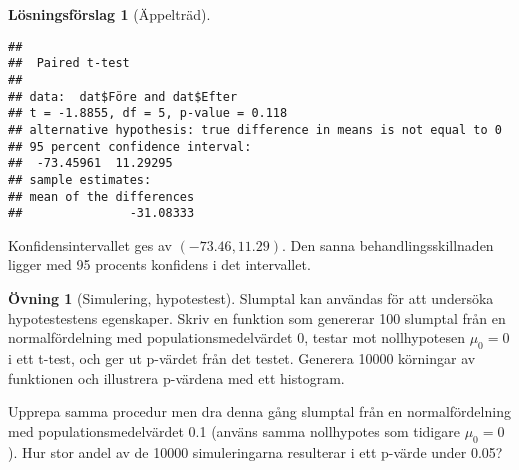 \documentclass[
]{book}
\theoremstyle{definition}
\theoremstyle{definition}
\theoremstyle{definition}
\newtheorem{exercise}{Övning}[chapter]
\theoremstyle{definition}
\newtheorem{hypothesis}{Lösningsförslag}[chapter]
\theoremstyle{remark}
\begin{document}
\begin{hypothesis}[Äppelträd]
\begin{verbatim}
## 
##  Paired t-test
## 
## data:  dat$Före and dat$Efter
## t = -1.8855, df = 5, p-value = 0.118
## alternative hypothesis: true difference in means is not equal to 0
## 95 percent confidence interval:
##  -73.45961  11.29295
## sample estimates:
## mean of the differences 
##               -31.08333
\end{verbatim}

Konfidensintervallet ges av \((-73.46, 11.29)\). Den sanna behandlingsskillnaden ligger med 95 procents konfidens i det intervallet.
\end{hypothesis}

\begin{exercise}[Simulering, hypotestest]
Slumptal kan användas för att undersöka hypotestestens egenskaper. Skriv en funktion som genererar 100 slumptal från en normalfördelning med populationsmedelvärdet 0, testar mot nollhypotesen \(\mu_0 = 0\) i ett t-test, och ger ut p-värdet från det testet. Generera 10000 körningar av funktionen och illustrera p-värdena med ett histogram.

Upprepa samma procedur men dra denna gång slumptal från en normalfördelning med populationsmedelvärdet 0.1 (använs samma nollhypotes som tidigare \(\mu_0 = 0\)). Hur stor andel av de 10000 simuleringarna resulterar i ett p-värde under 0.05?
\end{exercise}
\end{document}
